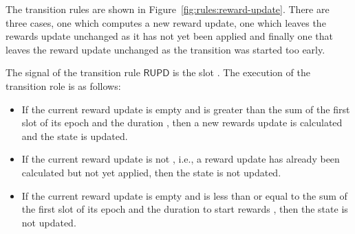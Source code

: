 The transition rules are shown in Figure~\ref{fig:rules:reward-update}. There
are three cases, one which computes a new reward update, one which leaves the
rewards update unchanged as it has not yet been applied and finally one that
leaves the reward update unchanged as the transition was started too early.

The signal of the transition rule $\mathsf{RUPD}$ is the slot . The
execution of the transition role is as follows:

\begin{itemize}
\item If the current reward update  is empty and  is greater than
  the sum of the first slot of its epoch and the duration \StartRewards, then a
  new rewards update is calculated and the state is updated.
\item If the current reward update  is not \Nothing, i.e., a reward
  update has already been calculated but not yet applied, then the state is not updated.
\item If the current reward update  is empty and  is less than or equal to the sum
  of the first slot of its epoch and the duration to start rewards \StartRewards,
  then the state is not updated.
\end{itemize}

